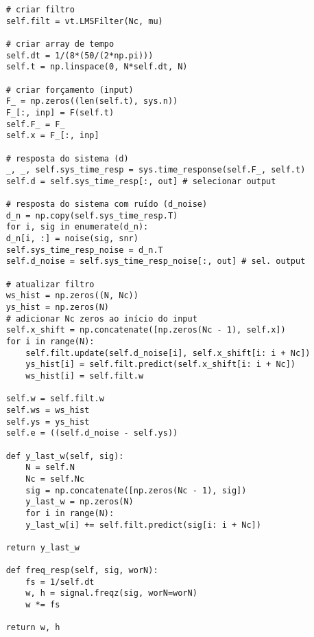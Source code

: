 \begin{verbatim}
	# criar filtro
	self.filt = vt.LMSFilter(Nc, mu)
	
	# criar array de tempo
	self.dt = 1/(8*(50/(2*np.pi)))
	self.t = np.linspace(0, N*self.dt, N)
	
	# criar forçamento (input)
	F_ = np.zeros((len(self.t), sys.n))
	F_[:, inp] = F(self.t)
	self.F_ = F_
	self.x = F_[:, inp]
	
	# resposta do sistema (d)
	_, _, self.sys_time_resp = sys.time_response(self.F_, self.t)
	self.d = self.sys_time_resp[:, out] # selecionar output
	
	# resposta do sistema com ruído (d_noise)
	d_n = np.copy(self.sys_time_resp.T)
	for i, sig in enumerate(d_n):
	d_n[i, :] = noise(sig, snr)
	self.sys_time_resp_noise = d_n.T
	self.d_noise = self.sys_time_resp_noise[:, out] # sel. output
	
	# atualizar filtro
	ws_hist = np.zeros((N, Nc))
	ys_hist = np.zeros(N)
	# adicionar Nc zeros ao início do input
	self.x_shift = np.concatenate([np.zeros(Nc - 1), self.x])
	for i in range(N):	
		self.filt.update(self.d_noise[i], self.x_shift[i: i + Nc])
		ys_hist[i] = self.filt.predict(self.x_shift[i: i + Nc])
		ws_hist[i] = self.filt.w

	self.w = self.filt.w
	self.ws = ws_hist
	self.ys = ys_hist
	self.e = ((self.d_noise - self.ys))
	
	def y_last_w(self, sig):
		N = self.N
		Nc = self.Nc
		sig = np.concatenate([np.zeros(Nc - 1), sig])
		y_last_w = np.zeros(N)
		for i in range(N):
		y_last_w[i] += self.filt.predict(sig[i: i + Nc])
	
	return y_last_w
	
	def freq_resp(self, sig, worN):
		fs = 1/self.dt
		w, h = signal.freqz(sig, worN=worN)
		w *= fs

	return w, h

\end{verbatim}
